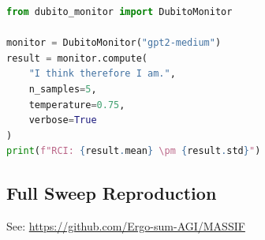 \documentclass[12pt,a4paper]{article}
\begin{document}
\begin{lstlisting}[language=Python]
from dubito_monitor import DubitoMonitor

monitor = DubitoMonitor("gpt2-medium")
result = monitor.compute(
    "I think therefore I am.",
    n_samples=5,
    temperature=0.75,
    verbose=True
)
print(f"RCI: {result.mean} \pm {result.std}")
\end{lstlisting}

\subsection{Full Sweep Reproduction}

See: \url{https://github.com/Ergo-sum-AGI/MASSIF}
\end{document}
